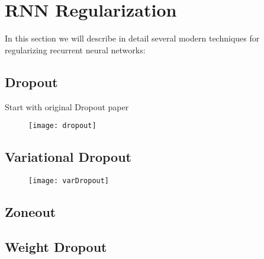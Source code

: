 \section{RNN Regularization}
\label{sec:rnnRegularization}

In this section we will describe in detail several modern techniques for regularizing recurrent neural networks:

\subsection{Dropout}

Start with original Dropout paper

\begin{figure}[H]
	\centering
	\texttt{[image: dropout]}
	\label{fig:dropout}
\end{figure}

\subsection{Variational Dropout}

\begin{figure}[H]
	\centering
	\texttt{[image: varDropout]}
	\label{fig:varDropout}
\end{figure}

\subsection{Zoneout}

\subsection{Weight Dropout}
